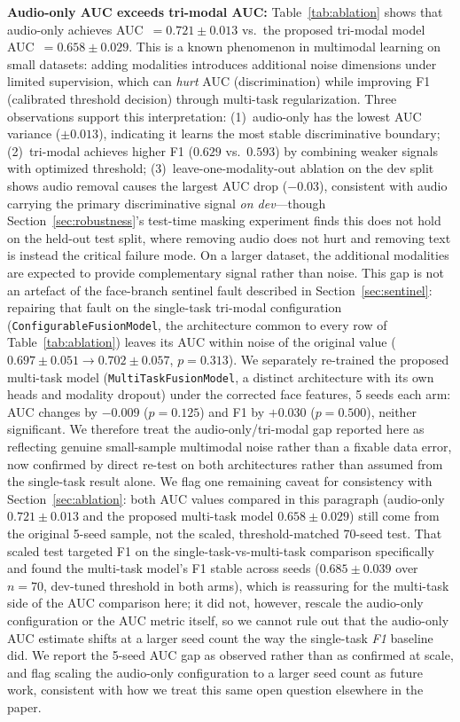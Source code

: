 \documentclass[5p,twocolumn]{elsarticle}
\begin{document}
\textbf{Audio-only AUC exceeds tri-modal AUC:} Table~\ref{tab:ablation}
shows that audio-only achieves AUC~$=0.721\pm0.013$ vs.\
the proposed tri-modal model AUC~$=0.658\pm0.029$. This is a known phenomenon
in multimodal learning on small datasets: adding modalities introduces
additional noise dimensions under limited supervision, which can
\emph{hurt} AUC (discrimination) while improving F1 (calibrated
threshold decision) through multi-task regularization. Three
observations support this interpretation: (1)~audio-only has the
lowest AUC variance ($\pm0.013$), indicating it learns the most
stable discriminative boundary; (2)~tri-modal achieves higher F1
($0.629$ vs.\ $0.593$) by combining weaker signals with optimized
threshold; (3)~leave-one-modality-out ablation on the dev split shows
audio removal causes the largest AUC drop ($-0.03$), consistent with
audio carrying the primary discriminative signal \emph{on dev}---though
Section~\ref{sec:robustness}'s test-time masking experiment finds this
does not hold on the held-out test split, where removing audio does
not hurt and removing text is instead the critical failure mode. On a
larger dataset, the additional modalities are expected to provide
complementary signal rather than noise. This gap is not an artefact of
the face-branch sentinel fault described in Section~\ref{sec:sentinel}:
repairing that fault on the single-task tri-modal configuration
(\texttt{ConfigurableFusionModel}, the architecture common to every row
of Table~\ref{tab:ablation}) leaves its AUC within noise of the
original value ($0.697\pm0.051\to0.702\pm0.057$, $p{=}0.313$). We
separately re-trained the proposed multi-task model
(\texttt{MultiTaskFusionModel}, a distinct architecture with its own
heads and modality dropout) under the corrected face features, 5 seeds
each arm: AUC changes by $-0.009$ ($p{=}0.125$) and F1 by $+0.030$
($p{=}0.500$), neither significant. We therefore treat the
audio-only/tri-modal gap reported here as reflecting genuine
small-sample multimodal noise rather than a fixable data error, now
confirmed by direct re-test on both architectures rather than assumed
from the single-task result alone. We flag one remaining caveat for
consistency with Section~\ref{sec:ablation}: both AUC values compared
in this paragraph (audio-only $0.721\pm0.013$ and the proposed
multi-task model $0.658\pm0.029$) still come from the original 5-seed
sample, not the scaled, threshold-matched 70-seed test. That scaled
test targeted F1 on the single-task-vs-multi-task comparison
specifically and found the multi-task model's F1 stable across seeds
($0.685\pm0.039$ over $n{=}70$, dev-tuned threshold in both arms),
which is reassuring for the multi-task side of the AUC
comparison here; it did not, however, rescale the audio-only
configuration or the AUC metric itself, so we cannot rule out that
the audio-only AUC estimate shifts at a larger seed count the way the
single-task \emph{F1} baseline did. We report the 5-seed AUC gap as
observed rather than as confirmed at scale, and flag scaling the
audio-only configuration to a larger seed count as future work,
consistent with how we treat this same open question elsewhere in the
paper.
\end{document}
